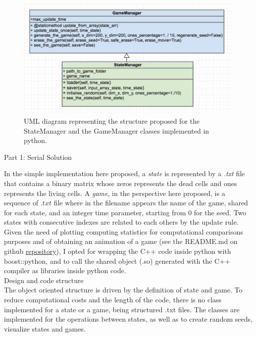 \documentclass[11pt, twoside]{article}
\begin{document}
\begin{figure}[htbp]
	\centering
	\includegraphics[scale=0.45]{figures/uml_py.pdf}
	\caption{UML diagram representing the structure proposed for the StateManager and the GameManager classes implemented in python.}
	\label{fig:uml_py}
\end{figure}


\begin{center}
	\color{MidnightBlue} {\Large Part 1: Serial Solution }\color{Black} 
\end{center}

\noindent
In the simple implementation here proposed, a \emph{state} is represented by a \emph{.txt} file that contains a binary matrix whose zeros represents the dead cells and ones represents the living cells. A \emph{game}, in the perspective here proposed, is a sequence of $.txt$ file where in the filename appears the name of the game, shared for each state, and an integer time parameter, starting from $0$ for the seed. Two states with consecutive indexes are related to each others by the update rule.
Given the need of plotting computing statistics for computational comparisons purposes and of obtaining an animation of a game (see the README.md on github \href{https://github.com/SebastianoF/game_of_life}{repository}), I opted for wrapping the C++ code inside python with boost::python, and to call the shared object (.so) generated with the C++ compiler as libraries inside python code. \\

\noindent
\color{MidnightBlue} {\Large Design and code structure }\color{Black}  \\
The object oriented structure is driven by the definition of state and game. To reduce computational costs and the length of the code, there is no class implemented for a state or a game, being structured .txt files. The classes are implemented for the operations between states, as well as to create random seeds, visualize states and games.
\end{document}
